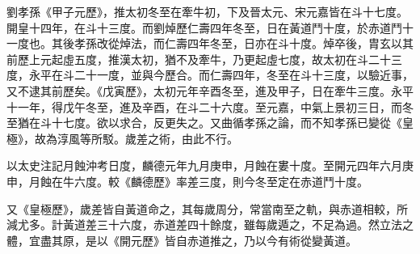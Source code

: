 \begin{pinyinscope}
 劉孝孫《甲子元歷》，推太初冬至在牽牛初，下及晉太元、宋元嘉皆在斗十七度。開皇十四年，在斗十三度。而劉焯歷仁壽四年冬至，日在黃道鬥十度，於赤道鬥十一度也。其後孝孫改從焯法，而仁壽四年冬至，日亦在斗十度。焯卒後，胄玄以其前歷上元起虛五度，推漢太初，猶不及牽牛，乃更起虛七度，故太初在斗二十三度，永平在斗二十一度，並與今歷合。而仁壽四年，冬至在斗十三度，以驗近事，又不逮其前歷矣。《戊寅歷》，太初元年辛酉冬至，進及甲子，日在牽牛三度。永平十一年，得戊午冬至，進及辛酉，在斗二十六度。至元嘉，中氣上景初三日，而冬至猶在斗十七度。欲以求合，反更失之。又曲循孝孫之論，而不知孝孫已變從《皇極》，故為淳風等所駁。歲差之術，由此不行。



 以太史注記月蝕沖考日度，麟德元年九月庚申，月蝕在婁十度。至開元四年六月庚申，月蝕在牛六度。較《麟德歷》率差三度，則今冬至定在赤道鬥十度。



 又《皇極歷》，歲差皆自黃道命之，其每歲周分，常當南至之軌，與赤道相較，所減尤多。計黃道差三十六度，赤道差四十餘度，雖每歲遁之，不足為過。然立法之體，宜盡其原，是以《開元歷》皆自赤道推之，乃以今有術從變黃道。



\end{pinyinscope}